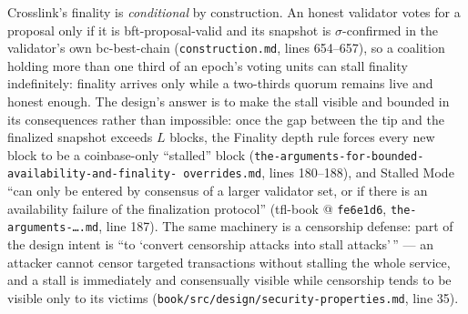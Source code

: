 \documentclass[11pt,a4paper]{article}
\theoremstyle{definition}
\begin{document}
Crosslink's finality is \emph{conditional} by construction. An honest
validator votes for a proposal only if it is bft-proposal-valid and its
snapshot is $\sigma$-confirmed in the validator's own bc-best-chain
(\texttt{construction.md}, lines 654--657), so a coalition holding more
than one third of an epoch's voting units can stall finality
indefinitely: finality arrives only while a two-thirds quorum remains
live and honest enough. The design's answer is to make the stall visible
and bounded in its consequences rather than impossible: once the gap
between the tip and the finalized snapshot exceeds $L$ blocks, the
Finality depth rule forces every new block to be a coinbase-only
``stalled'' block
(\texttt{the-arguments-for-bounded-availability-and-finality-%
overrides.md}, lines 180--188), and Stalled Mode ``can only be entered by
consensus of a larger validator set, or if there is an availability
failure of the finalization protocol'' (tfl-book @ \texttt{fe6e1d6},
\texttt{the-arguments-\ldots.md},
line 187). The same machinery is a censorship defense: part of the design
intent is ``to `convert censorship attacks into stall attacks'\,'' --- an
attacker cannot censor targeted transactions without stalling the whole
service, and a stall is immediately and consensually visible while
censorship tends to be visible only to its victims
(\texttt{book/src/design/security-properties.md}, line 35).
\end{document}
